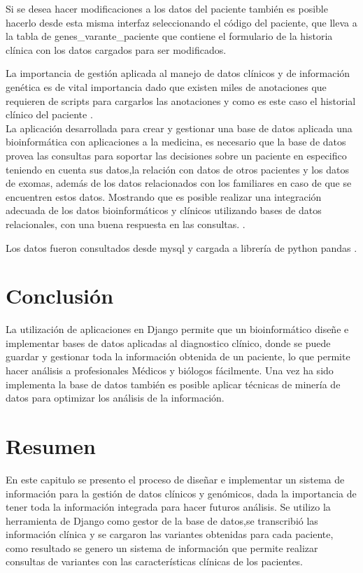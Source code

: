 Si se desea hacer modificaciones a los datos del paciente también es posible hacerlo desde esta misma interfaz seleccionando el código del paciente, que lleva a la tabla de genes\_varante\_paciente que contiene el formulario de la historia clínica con los datos cargados para ser modificados. 

La importancia de gestión aplicada al manejo de datos clínicos y de información genética es de vital importancia dado que existen miles de anotaciones que requieren de scripts para cargarlos las anotaciones y como es este caso el historial clínico del paciente \cite{Paila2013}. \\

La aplicación desarrollada para crear y gestionar una base de datos aplicada una bioinformática con aplicaciones a la medicina, es necesario que la base de datos provea las consultas para soportar las decisiones sobre un paciente en especifico teniendo en cuenta sus datos,la relación con datos de otros pacientes y los datos de exomas, además de los datos relacionados con los familiares en caso de que se encuentren estos datos. Mostrando que es posible realizar una integración adecuada de los datos bioinformáticos y clínicos utilizando bases de datos relacionales, con una buena respuesta en las consultas. \cite{Sujansky2001}.

Los datos fueron consultados  desde mysql y cargada a librería de python pandas \cite{mckinneypandas}.

\section{Conclusión}

La utilización de aplicaciones en Django permite que un bioinformático diseñe e implementar bases de datos aplicadas al diagnostico clínico, donde se puede guardar y gestionar toda la información obtenida de un paciente, lo que permite hacer análisis a profesionales Médicos y biólogos fácilmente. Una vez ha sido implementa la base de datos también es posible aplicar técnicas de minería de datos para optimizar los análisis de la información. \\

\section*{Resumen}

En este capitulo se presento el proceso de diseñar e implementar un sistema de información para la gestión de datos clínicos y genómicos, dada la importancia de tener toda la información integrada para hacer futuros análisis. Se utilizo la herramienta de Django como gestor de la base de datos,se transcribió las información clínica y se cargaron las variantes obtenidas para cada paciente, como resultado se genero un sistema de información que permite realizar consultas de variantes con las características clínicas de los pacientes.   